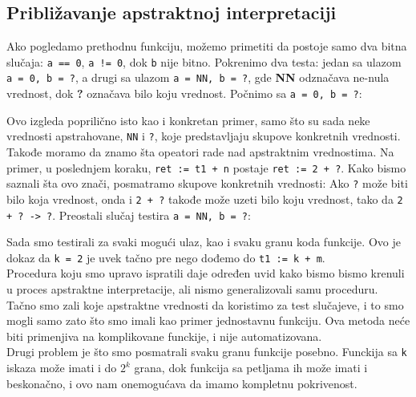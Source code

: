 \subsection{Približavanje apstraktnoj interpretaciji}
\label{subsec:approachingabsint}
Ako pogledamo prethodnu funkciju, možemo primetiti da postoje samo dva bitna slučaja: \texttt{a == 0}, \texttt{a != 0}, dok
\texttt{b} nije bitno. 
Pokrenimo dva testa: jedan sa ulazom \texttt{a = 0, b = ?}, a drugi sa ulazom \texttt{a = NN, b = ?}, gde \textbf{NN} odznačava ne-nula vrednost, dok \textbf{?} označava bilo koju vrednost. Počnimo sa \texttt{a = 0, b = ?}:

Ovo izgleda poprilično isto kao i konkretan primer, samo što su sada neke vrednosti apstrahovane, \texttt{NN} i \texttt{?},
koje predstavljaju skupove konkretnih vrednosti.\\
Takođe moramo da znamo šta opeatori rade nad apstraktnim vrednostima. Na primer, u poslednjem koraku,
\texttt{ret := t1 + n} postaje \texttt{ret := 2 + ?}. Kako bismo saznali šta ovo znači, posmatramo skupove konkretnih vrednosti: Ako \texttt{?} može biti bilo koja vrednost, onda i \texttt{2 + ?} takođe može uzeti bilo koju vrednost, tako da \texttt{2 + ? -> ?}.
Preostali slučaj testira \texttt{a = NN, b = ?}:

Sada smo testirali za svaki mogući ulaz, kao i svaku granu koda funkcije. Ovo je dokaz da \texttt{k = 2} je uvek tačno
pre nego dođemo do \texttt{t1 := k + m}.\\
Procedura koju smo upravo ispratili daje određen uvid kako bismo bismo krenuli u proces apstraktne interpretacije, ali
nismo generalizovali samu proceduru. Tačno smo zali koje apstraktne vrednosti da koristimo za test slučajeve, i to smo mogli
samo zato što smo imali kao primer jednostavnu funkciju. Ova metoda neće biti primenjiva na komplikovane funckije, i nije
automatizovana.\\
Drugi problem je što smo posmatrali svaku granu funkcije posebno. Funckija sa \texttt{k} iskaza može imati i do
\texttt{$2^k$} grana, dok funkcija sa petljama ih može imati i beskonačno, i ovo nam onemogućava da imamo kompletnu
pokrivenost.

